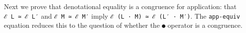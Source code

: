 Next we prove that denotational equality is a congruence for
application: that \texttt{ℰ\ L\ ≃\ ℰ\ L′} and \texttt{ℰ\ M\ ≃\ ℰ\ M′}
imply \texttt{ℰ\ (L\ ·\ M)\ ≃\ ℰ\ (L′\ ·\ M′)}. The \texttt{app-equiv}
equation reduces this to the question of whether the \texttt{●} operator
is a congruence.

\begin{fence}
\begin{code}%
\>[0]\AgdaSpace{}%
\AgdaSymbol{:}\AgdaSpace{}%
\AgdaSymbol{\}\{}\AgdaSpace{}%
\AgdaSpace{}%
\AgdaSpace{}%
\AgdaSpace{}%
\AgdaSymbol{:}\AgdaSpace{}%
\AgdaSpace{}%
\AgdaSymbol{\}}\<%
\\
\>[0][@{}l@{\AgdaIndent{0}}]%
\>[2]\AgdaSpace{}%
\AgdaSpace{}%
\AgdaSpace{}%
\AgdaSpace{}%
\AgdaSpace{}%
\AgdaSpace{}%
\AgdaSpace{}%
\<%
\\
%
\>[2]\AgdaSpace{}%
\AgdaSymbol{(}\AgdaSpace{}%
\AgdaSpace{}%
\AgdaSymbol{)}\AgdaSpace{}%
\AgdaSpace{}%
\AgdaSymbol{(}\AgdaSpace{}%
\AgdaSpace{}%
\AgdaSymbol{)}\<%
\\
\>[0]\AgdaSpace{}%
\AgdaSymbol{\{}\AgdaSymbol{\}}\AgdaSpace{}%
\AgdaSpace{}%
\AgdaSpace{}%
\AgdaSpace{}%
\AgdaSpace{}%
\AgdaSymbol{=}\AgdaSpace{}%
%
\>[963I]\AgdaSpace{}%
\AgdaSpace{}%
\AgdaSpace{}%
\AgdaSpace{}%
\AgdaSpace{}%
\AgdaSpace{}%
\AgdaSymbol{)}\AgdaSpace{}%
\AgdaOperator{\AgdaInductiveConstructor{,}}\<%
\\
\>[.][@{}l@{}]\<[963I]%
\>[25]\AgdaSpace{}%
\AgdaSpace{}%
\AgdaSpace{}%
\AgdaSpace{}%
\AgdaSpace{}%
\AgdaSymbol{(}\AgdaSpace{}%
\AgdaSymbol{)}\AgdaSpace{}%
\AgdaSymbol{(}\AgdaSpace{}%
\AgdaSymbol{))}\AgdaSpace{}%
\<%
\\
\>[0][@{}l@{\AgdaIndent{0}}]%
\>[2]\<%

\end{code}
\end{fence}
